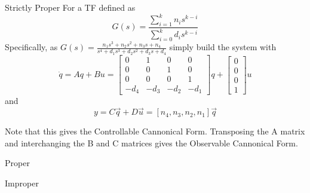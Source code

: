 \documentclass{../templates/topic}
\begin{document}
\begin{section}{Strictly Proper}
	For a TF defined as
	\begin{equation*}
		G(s)=\frac{\sum\limits_{i=1}^k{n_{i}s^{k-i}}}{\sum\limits_{i=0}^k{d_{i}s^{k-i}}}
	\end{equation*}
	Specifically, as $G(s)=\frac{n_1s^3+n_2s^2+n_3s+n_4}{s^4+d_1s^3+d_2s^2+d_3s+d_4}$
	simply build the system with
	\[
	\dot{q}=Aq+Bu=
		\begin{bmatrix}
			0 & 1 & 0 & 0 \\
			0 & 0 & 1 & 0 \\
			0 & 0 & 0 & 1 \\
			-d_4 & -d_3 & -d_2 & -d_1
		\end{bmatrix}
		q +
		\begin{bmatrix}
			0 \\ 0 \\ 0 \\ 1
		\end{bmatrix}
		u
	\]
	and
	\[
	y = C\vec{q}+D\vec{u}=[n_4, n_3, n_2, n_1]\vec{q}
	\]
	
	Note that this gives the Controllable Cannonical Form. Transposing the A matrix and interchanging the B and C matrices gives the Observable Cannonical Form.
\end{section}

\begin{section}{Proper}
\end{section}

\begin{section}{Improper}
\end{section}
\end{document}
